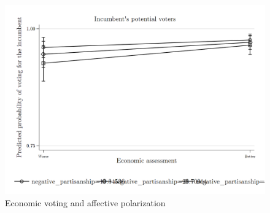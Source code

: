 \documentclass[a4paper, svgnames]{article}
\begin{document}
\begin{figure}[H]
	\centering
	\includegraphics[scale=0.35]{Figures/margins.png}
	\caption{\label{fig:margins} Economic voting and affective polarization}
\end{figure}


\end{document}
